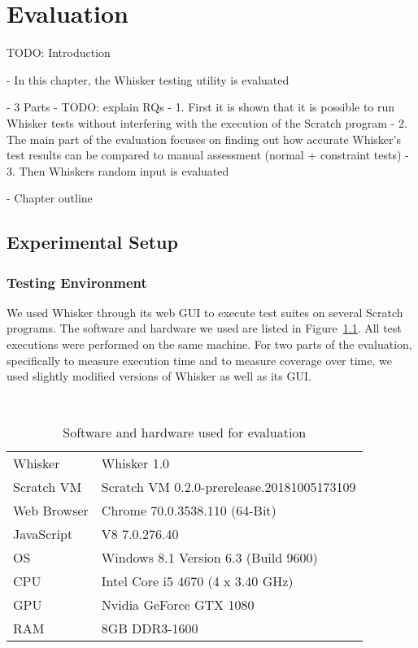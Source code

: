 

\chapter{Evaluation}%
\label{cha:evaluation}

TODO: Introduction

- In this chapter, the Whisker testing utility is evaluated

- 3 Parts
- TODO: explain RQs
    - 1. First it is shown that it is possible to run Whisker tests without interfering with the execution of the Scratch program
    - 2. The main part of the evaluation focuses on finding out how accurate Whisker's test results can be compared to manual assessment (normal + constraint tests)
    - 3. Then Whiskers random input is evaluated

- Chapter outline

\section{Experimental Setup}

\subsection{Testing Environment}

We used Whisker through its web GUI to execute test suites on several Scratch programs.
The software and hardware we used are listed in Figure~\ref{tab:evaluation_setup}.
All test executions were performed on the same machine.
For two parts of the evaluation,
specifically to measure execution time and to measure coverage over time,
we used slightly modified versions of Whisker as well as its GUI.

\begin{table}[htpb]
    \centering
    \scriptsize \tt
    \begin{tabular}{ll}
        \toprule
        Whisker     & Whisker 1.0 \\
        Scratch VM  & Scratch VM 0.2.0-prerelease.20181005173109 \\
        Web Browser & Chrome 70.0.3538.110 (64-Bit) \\
        JavaScript  & V8 7.0.276.40 \\
        OS          & Windows 8.1 Version 6.3 (Build 9600) \\
        CPU         & Intel Core i5 4670 (4 x  3.40 GHz) \\
        GPU         & Nvidia GeForce GTX 1080 \\
        RAM         & 8GB DDR3-1600 \\
        \bottomrule
    \end{tabular}
    \caption{Software and hardware used for evaluation}
    \label{tab:evaluation_setup}
\end{table}

